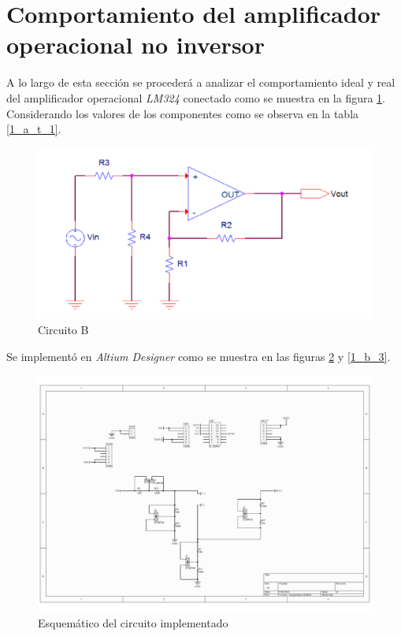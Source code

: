 \section{Comportamiento del amplificador operacional no inversor}

A lo largo de esta sección se procederá a analizar el comportamiento
ideal y real del amplificador operacional \emph{LM324 }conectado como
se muestra en la figura \ref{1_b_1}. Considerando los valores de
los componentes como se observa en la tabla \ref{1_a_t_1}. 

\begin{figure}[H]
\begin{centering}
\includegraphics[scale=0.5]{../Ex1/ib/Resources1b/circuit}
\par\end{centering}
\caption{Circuito B}
\label{1_b_1}

\end{figure}

Se implementó en \emph{Altium Designer }como se muestra en las figuras
\ref{1_b_2} y \ref{1_b_3}.

\begin{figure}[H]
\begin{centering}
\includegraphics[scale=0.5]{../Ex1/ib/Resources1b/Schematic}
\par\end{centering}
\caption{Esquemático del circuito implementado}
\label{1_b_2}

\end{figure}

